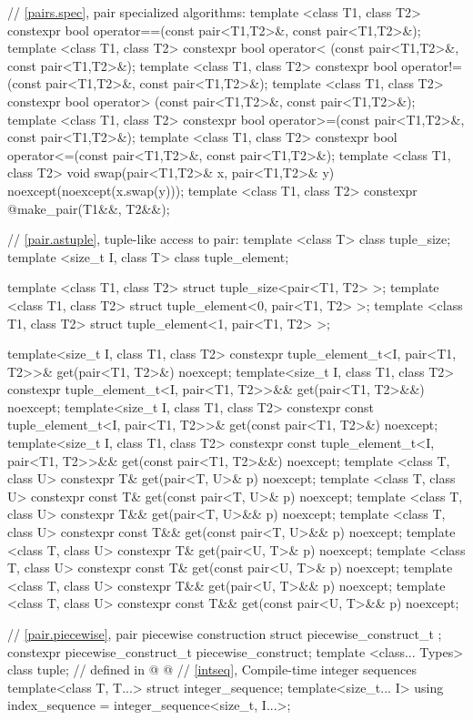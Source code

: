\begin{codeblock}
{  // \ref{pairs.spec}, pair specialized algorithms:
  template <class T1, class T2>
    constexpr bool operator==(const pair<T1,T2>&, const pair<T1,T2>&);
  template <class T1, class T2>
    constexpr bool operator< (const pair<T1,T2>&, const pair<T1,T2>&);
  template <class T1, class T2>
    constexpr bool operator!=(const pair<T1,T2>&, const pair<T1,T2>&);
  template <class T1, class T2>
    constexpr bool operator> (const pair<T1,T2>&, const pair<T1,T2>&);
  template <class T1, class T2>
    constexpr bool operator>=(const pair<T1,T2>&, const pair<T1,T2>&);
  template <class T1, class T2>
    constexpr bool operator<=(const pair<T1,T2>&, const pair<T1,T2>&);
  template <class T1, class T2>
    void swap(pair<T1,T2>& x, pair<T1,T2>& y) noexcept(noexcept(x.swap(y)));
  template <class T1, class T2>
    constexpr @\seebelow@ make_pair(T1&&, T2&&);

  // \ref{pair.astuple}, tuple-like access to pair:
  template <class T> class tuple_size;
  template <size_t I, class T> class tuple_element;

  template <class T1, class T2> struct tuple_size<pair<T1, T2> >;
  template <class T1, class T2> struct tuple_element<0, pair<T1, T2> >;
  template <class T1, class T2> struct tuple_element<1, pair<T1, T2> >;

  template<size_t I, class T1, class T2>
    constexpr tuple_element_t<I, pair<T1, T2>>&
      get(pair<T1, T2>&) noexcept;
  template<size_t I, class T1, class T2>
    constexpr tuple_element_t<I, pair<T1, T2>>&&
      get(pair<T1, T2>&&) noexcept;
  template<size_t I, class T1, class T2>
    constexpr const tuple_element_t<I, pair<T1, T2>>&
      get(const pair<T1, T2>&) noexcept;
  template<size_t I, class T1, class T2>
    constexpr const tuple_element_t<I, pair<T1, T2>>&&
      get(const pair<T1, T2>&&) noexcept;
  template <class T, class U>
    constexpr T& get(pair<T, U>& p) noexcept;
  template <class T, class U>
    constexpr const T& get(const pair<T, U>& p) noexcept;
  template <class T, class U>
    constexpr T&& get(pair<T, U>&& p) noexcept;
  template <class T, class U>
    constexpr const T&& get(const pair<T, U>&& p) noexcept;
  template <class T, class U>
    constexpr T& get(pair<U, T>& p) noexcept;
  template <class T, class U>
    constexpr const T& get(const pair<U, T>& p) noexcept;
  template <class T, class U>
    constexpr T&& get(pair<U, T>&& p) noexcept;
  template <class T, class U>
    constexpr const T&& get(const pair<U, T>&& p) noexcept;

  // \ref{pair.piecewise}, pair piecewise construction
  struct piecewise_construct_t { };
  constexpr piecewise_construct_t piecewise_construct{};
  template <class... Types> class tuple;  // defined in 
@
%
%
%
@
  // \ref{intseq}, Compile-time integer sequences
  template<class T, T...> struct integer_sequence;
  template<size_t... I>
    using index_sequence = integer_sequence<size_t, I...>;

}
\end{codeblock}
